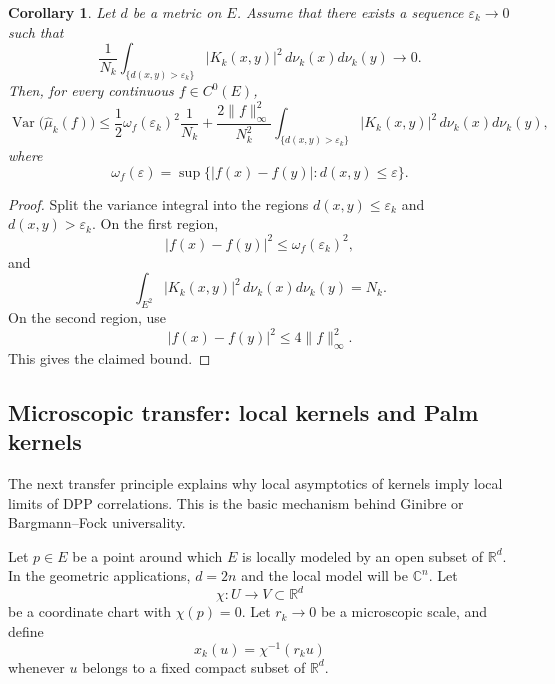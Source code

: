 \documentclass[12pt,a4paper,reqno]{article}
\theoremstyle{thmstyleone}
\newtheorem{corollary}[theorem]{Corollary}
\theoremstyle{thmstylethree}
\theoremstyle{thmstyletwo}
\newtheorem{remark}[theorem]{Remark}
\numberwithin{equation}{subsection}
\def\leq{\leqslant}
\begin{document}
\begin{corollary}\label{cor:variance-off-diagonal}
Let $d$ be a metric on $E$. Assume that there exists a sequence
$\varepsilon_k\to0$ such that
\[
    \frac{1}{N_k}
    \int_{\{d(x,y)>\varepsilon_k\}}
        |K_k(x,y)|^2
        \,d\nu_k(x)d\nu_k(y)
    \longrightarrow 0.
\]
Then, for every continuous $f\in C^0(E)$,
\[
    \operatorname{Var}\big(\widehat\mu_k(f)\big)
    \leq
    \frac12\omega_f(\varepsilon_k)^2\frac{1}{N_k}
    +
    \frac{2\|f\|_\infty^2}{N_k^2}
    \int_{\{d(x,y)>\varepsilon_k\}}
        |K_k(x,y)|^2
        \,d\nu_k(x)d\nu_k(y),
\]
where
\[
    \omega_f(\varepsilon)
    =
    \sup\{|f(x)-f(y)|:d(x,y)\leq\varepsilon\}.
\]
\end{corollary}

\begin{proof}
Split the variance integral into the regions $d(x,y)\leq\varepsilon_k$ and $d(x,y)>\varepsilon_k$. On the first region,
\[
    |f(x)-f(y)|^2\leq \omega_f(\varepsilon_k)^2,
\]
and
\[
    \int_{E^2}|K_k(x,y)|^2\,d\nu_k(x)d\nu_k(y)=N_k.
\]
On the second region, use
\[
    |f(x)-f(y)|^2\leq 4\|f\|_\infty^2.
\]
This gives the claimed bound.
\end{proof}


\subsection{Microscopic transfer: local kernels and Palm kernels}\label{sec:Palm-transfer}

The next transfer principle explains why local asymptotics of kernels imply local limits of DPP correlations. This is the basic mechanism behind Ginibre or Bargmann--Fock universality.

Let $p\in E$ be a point around which $E$ is locally modeled by an open subset of $\mathbb R^d$. In the geometric applications, $d=2n$ and the local model will be $\mathbb C^n$. Let
\[
    \chi:U\longrightarrow V\subset\mathbb R^d
\]
be a coordinate chart with $\chi(p)=0$. Let $r_k\to0$ be a microscopic scale, and define
\[
    x_k(u)=\chi^{-1}(r_k u)
\]
whenever $u$ belongs to a fixed compact subset of $\mathbb R^d$.
\end{document}
